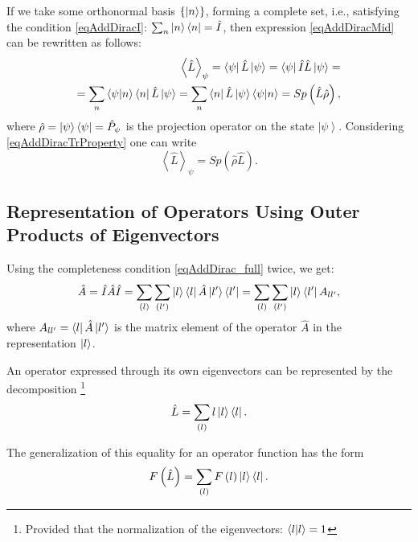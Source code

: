If we take some orthonormal basis $\{\ket{ n }\}$,
forming a complete set, i.e., satisfying the condition
\eqref{eqAddDiracI}: $\sum_n \ket{ n }\bra{ n } =
\hat{I}$, then expression \eqref{eqAddDiracMid}
can be rewritten as follows:
\begin{eqnarray}
\left< \hat{L} \right>_{\psi} = 
\bra{\psi}\hat{L}\ket{\psi} = 
\bra{\psi}\hat{I}\hat{L}\ket{\psi} = 
\nonumber \\
= 
\sum_n \bra{\psi}\ket{n}\bra{n}
\hat{L}\ket{\psi} = 
\sum_n \bra{n}
\hat{L}\ket{\psi}\bra{\psi}\ket{n} = 
Sp \left(\hat{L} \hat{\rho} \right),
\nonumber
\end{eqnarray}
where 
\(
\hat{\rho} = \ket{\psi}\bra{\psi} = \hat{P}_{\psi}
\) is the projection operator on the state 
$\left| \psi \right>$.
Considering \eqref{eqAddDiracTrProperty} one can write
\begin{equation}
\left< \hat{L} \right>_{\psi} = Sp \left(\hat{\rho} \hat{L} \right).
\label{eqAddDiracMidViaRho}
\end{equation}

\subsection{Representation of Operators Using Outer Products of Eigenvectors}
Using the completeness condition \eqref{eqAddDirac_full} twice, we get:
\begin{equation}
\hat{A} = \hat{I} \hat{A} \hat{I} = \sum_{(l)}\sum_{(l')} 
\ket{l}\bra{l} \hat{A} \ket{l'}\bra{l'} = 
\sum_{(l)}\sum_{(l')} 
\ket{l}\bra{l'} A_{ll'},
\end{equation}  
where $A_{ll'} = \bra{l} \hat{A} \ket{l'}$ is the matrix
element of the operator $\hat{A}$ in the representation $\ket{l}$.
 
An operator expressed through its own eigenvectors can be
represented by the decomposition \footnote{Provided that
the normalization of the eigenvectors: $\bra{l}\ket{l} = 1$} 
\begin{equation}
\hat{L} = \sum_{(l)} 
l \ket{l}\bra{l}.
\end{equation}  

The generalization of this equality for an operator function has the form
\begin{equation}
F\left(\hat{L}\right) = \sum_{(l)} 
F\left(l\right) \ket{l}\bra{l}.
\label{eqAddDiracFL}
\end{equation}  

